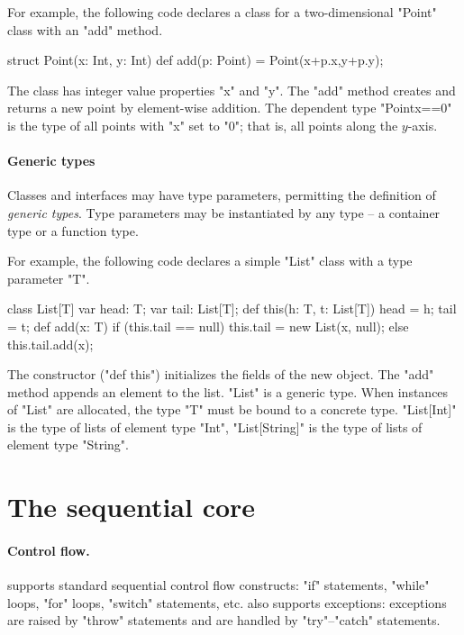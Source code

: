 For example, the following code declares a class for a two-dimensional
\xcd"Point" class with an \xcd"add" method.
\begin{xten}
struct Point(x: Int, y: Int) {
    def add(p: Point) = Point(x+p.x,y+p.y);
}
\end{xten}
The class has integer value properties \xcd"x" and \xcd"y".
The \xcd"add" method creates and returns a new point by
element-wise addition.
The dependent type \xcd"Point{x==0}" is the type of all points
with \xcd"x" set to \xcd"0"; that is, all points along the $y$-axis.

\paragraph{Generic types}

Classes and interfaces may have type parameters, permitting the definition of
{\em generic types}.  Type parameters may be instantiated by any type -- a
container type or a function type.

For example,
the following code declares a simple \xcd"List" class with a
type parameter \xcd"T".

\begin{xten}
class List[T] {
    var head: T;
    var tail: List[T];
    def this(h: T, t: List[T]) { head = h; tail = t; }
    def add(x: T) {
        if (this.tail == null)
            this.tail = new List(x, null);
        else
            this.tail.add(x);
    }
}
\end{xten}
The constructor (\xcd"def this") initializes the fields of the new object.
The \xcd"add" method appends an element to the list.
\xcd"List" is a generic type.  When  instances of \xcd"List" are
allocated, the type \param{} \xcd"T" must be bound to a concrete
type.  \xcd"List[Int]" is the type of lists of element type
\xcd"Int", \xcd"List[String]" is the type of lists of element
type \xcd"String".

\section{The sequential core}

\paragraph{Control flow.}  \Xten{} supports standard sequential control flow
constructs: \xcd"if" statements, \xcd"while" loops, \xcd"for" loops,
\xcd"switch" statements, etc.  \Xten{} also supports exceptions: exceptions are
raised by \xcd"throw" statements and are handled by \xcd"try"--\xcd"catch"
statements.

